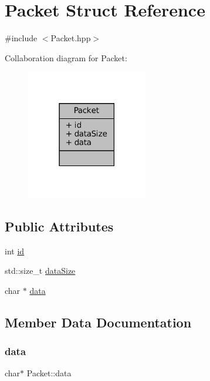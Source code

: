 \hypertarget{structPacket}{}\section{Packet Struct Reference}
\label{structPacket}


{\ttfamily \#include $<$Packet.\+hpp$>$}



Collaboration diagram for Packet\+:
\nopagebreak
\begin{figure}[H]
\begin{center}
\leavevmode
\includegraphics[width=150pt]{structPacket__coll__graph}
\end{center}
\end{figure}
\subsection*{Public Attributes}
\begin{DoxyCompactItemize}
\item 
int \mbox{\hyperlink{structPacket_a354ba55bd6aec819bbe3379fb402f712}{id}}
\item 
std\+::size\+\_\+t \mbox{\hyperlink{structPacket_a9add4f81e6a9256f5a413697a4626d5b}{data\+Size}}
\item 
char $\ast$ \mbox{\hyperlink{structPacket_a6ce50b69127890b9012cb91f287f137f}{data}}
\end{DoxyCompactItemize}


\subsection{Member Data Documentation}
\mbox{\label{structPacket_a6ce50b69127890b9012cb91f287f137f}} 
\subsubsection{\texorpdfstring{data}{data}}
{\footnotesize\ttfamily char$\ast$ Packet\+::data}

